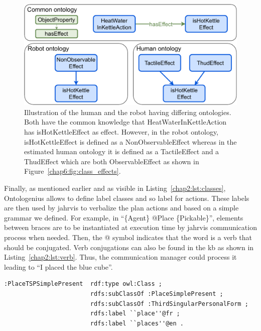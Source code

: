 \documentclass[a4paper,11pt,twoside]{StyleThese}
\begin{document}
\begin{figure}[!ht]
	\includegraphics[width=\linewidth]{figures/chapter2/kettle.pdf}
	\caption{Illustration of the human and the robot having differing ontologies. Both have the common knowledge that HeatWaterInKettleAction has isHotKettleEffect as effect. However, in the robot ontology, isHotKettleEffect is defined as a NonObservableEffect whereas in the estimated human ontology it is defined as a TactileEffect and a ThudEffect which are both ObservableEffect as shown in Figure~\ref{chap6:fig:class_effects}.}
	\label{chap6:fig:kettle}
\end{figure}

Finally, as mentioned earlier and as visible in Listing~\ref{chap2:lst:classes}, Ontologenius allows to define label classes and so label for actions. These labels are then used by \acrshort{jahrvis} to verbalize the plan actions and based on a simple grammar we defined. For example, in ``\{Agent\} @Place \{Pickable\}'', elements between braces are to be instantiated at execution time by \acrshort{jahrvis} communication process when needed. Then, the @ symbol indicates that the word is a verb that should be conjugated. Verb conjugations can also be found in the \acrshort{kb} as shown in Listing~\ref{chap2:lst:verb}. Thus, the communication manager could process it leading to ``I placed the blue cube''.

\newpage

\begin{lstlisting}[style=OwlTurtle, label={chap2:lst:verb}, caption={Description of the class describing the verb Place in the third-person present-tense, in the OWL language using the Turle syntax.} ]
:PlaceTSPSimplePresent	rdf:type owl:Class ;
						rdfs:subClassOf :PlaceSimplePresent ;
						rdfs:subClassOf :ThirdSingularPersonalForm ;
						rdfs:label ``place''@fr ;
						rdfs:label ``places''@en .
\end{lstlisting}
\end{document}
